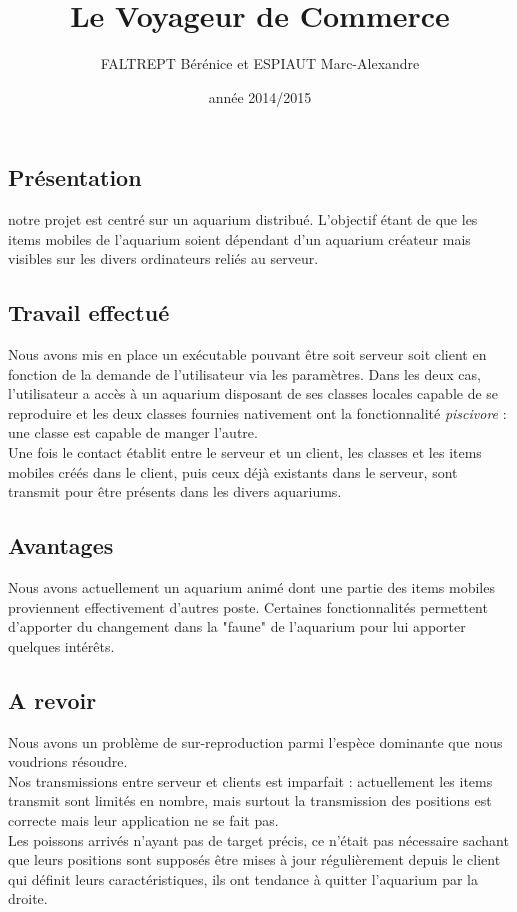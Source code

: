 \documentclass[a4paper, 12pt]{report}
\title{Le Voyageur de Commerce}
\author {FALTREPT Bérénice et ESPIAUT Marc-Alexandre}
\date{année 2014/2015}
\begin{document}
	\begin{spacing}{1.3}
\maketitle%
\tableofcontents
\newpage
\textcolor{colortitre1}{\section*{Présentation}} 

notre projet est centré sur un aquarium distribué. L'objectif étant de que les items mobiles de l'aquarium soient dépendant d'un aquarium créateur mais visibles sur les divers ordinateurs reliés au serveur.


\textcolor{colortitre1}{\subsection*{Travail effectué}}  	
	
	Nous avons mis en place un exécutable pouvant être soit serveur soit client en fonction de la demande de l'utilisateur via les paramètres. Dans les deux cas, l'utilisateur a accès à un aquarium disposant de ses classes locales capable de se reproduire et les deux classes fournies nativement ont la fonctionnalité \textit{piscivore} : une classe est capable de manger l'autre.\\
	Une fois le contact établit entre le serveur et un client, les classes et les items mobiles créés dans le client, puis ceux déjà existants dans le serveur, sont transmit pour être présents dans les divers aquariums.
	
		\textcolor{colortitre2}{\subsection*{Avantages}}  
	Nous avons actuellement un aquarium animé dont une partie des items mobiles proviennent effectivement d'autres poste. Certaines fonctionnalités permettent d'apporter du changement dans la "faune" de l'aquarium pour lui apporter quelques intérêts.
	
	\textcolor{colortitre2}{\subsection*{A revoir}}  
	Nous avons un problème de sur-reproduction parmi l'espèce dominante que nous voudrions résoudre.\\
	Nos transmissions entre serveur et clients est imparfait : actuellement les items transmit sont limités en nombre, mais surtout la transmission des positions est correcte mais leur application ne se fait pas. \\Les poissons arrivés n'ayant pas de target précis, ce n'était pas nécessaire sachant que leurs positions sont supposés être mises à jour régulièrement depuis le client qui définit leurs caractéristiques, ils ont tendance à quitter l'aquarium par la droite.
	

\end{spacing}
\end{document}
